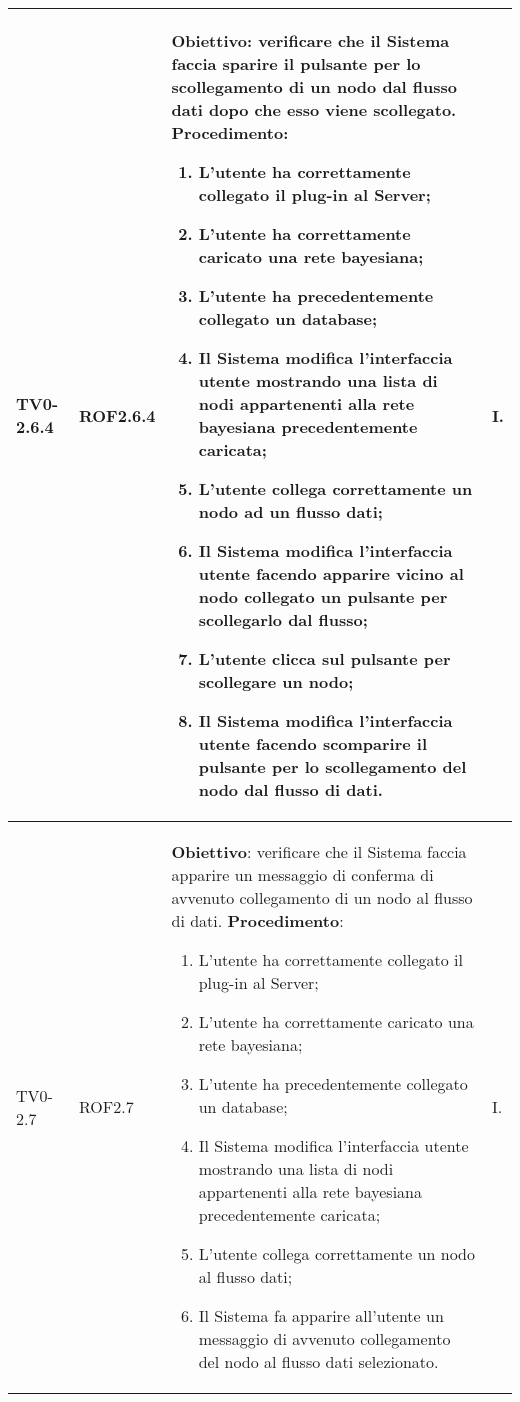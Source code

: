\begin{longtable}{|C{.15\textwidth}|C{.13\textwidth}|m{.52\textwidth}|C{.08\textwidth}|}
TV0-2.6.4 & ROF2.6.4 &
	\textbf{Obiettivo}: verificare che il Sistema faccia sparire il pulsante per lo scollegamento di un nodo dal flusso dati dopo che esso viene scollegato. \newline
	\textbf{Procedimento}:
	\begin{enumerate}
		\item L'utente ha correttamente collegato il plug-in al Server;
		\item L'utente ha correttamente caricato una rete bayesiana;
		\item L'utente ha precedentemente collegato un database;
		\item Il Sistema modifica l'interfaccia utente mostrando una lista di nodi appartenenti alla rete bayesiana precedentemente caricata;
		\item L'utente collega correttamente un nodo ad un flusso dati;
		\item Il Sistema modifica l'interfaccia utente facendo apparire vicino al nodo collegato un pulsante per scollegarlo dal flusso;
		\item L'utente clicca sul pulsante per scollegare un nodo;
		\item Il Sistema modifica l'interfaccia utente facendo scomparire il pulsante per lo scollegamento del nodo dal flusso di dati. 
	\end{enumerate}
	& I. \\
\hline

TV0-2.7 & ROF2.7 &
	\textbf{Obiettivo}: verificare che il Sistema faccia apparire un messaggio di conferma di avvenuto collegamento di un nodo al flusso di dati. \newline
	\textbf{Procedimento}:
	\begin{enumerate}
		\item L'utente ha correttamente collegato il plug-in al Server;
		\item L'utente ha correttamente caricato una rete bayesiana;
		\item L'utente ha precedentemente collegato un database;
		\item Il Sistema modifica l'interfaccia utente mostrando una lista di nodi appartenenti alla rete bayesiana precedentemente caricata;
		\item L'utente collega correttamente un nodo al flusso dati;
		\item Il Sistema fa apparire all'utente un messaggio di avvenuto collegamento del nodo al flusso dati selezionato.
	\end{enumerate}
	& I. \\
\hline


\end{longtable}

